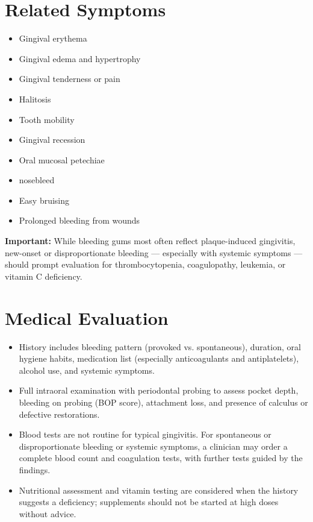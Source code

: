 \section*{Related Symptoms}
\begin{itemize}
 \item Gingival erythema
 \item Gingival edema and hypertrophy
 \item Gingival tenderness or pain
 \item Halitosis
 \item Tooth mobility
 \item Gingival recession
 \item Oral mucosal petechiae
 \item nosebleed
 \item Easy bruising
 \item Prolonged bleeding from wounds
\end{itemize}
\textbf{Important:} While bleeding gums most often reflect plaque-induced gingivitis, new-onset or disproportionate bleeding — especially with systemic symptoms — should prompt evaluation for thrombocytopenia, coagulopathy, leukemia, or vitamin C deficiency.

\section*{Medical Evaluation}
\begin{itemize}
 \item History includes bleeding pattern (provoked vs. spontaneous), duration, oral hygiene habits, medication list (especially anticoagulants and antiplatelets), alcohol use, and systemic symptoms.
 \item Full intraoral examination with periodontal probing to assess pocket depth, bleeding on probing (BOP score), attachment loss, and presence of calculus or defective restorations.
 \item Blood tests are not routine for typical gingivitis. For spontaneous or disproportionate bleeding or systemic symptoms, a clinician may order a complete blood count and coagulation tests, with further tests guided by the findings.
 \item Nutritional assessment and vitamin testing are considered when the history suggests a deficiency; supplements should not be started at high doses without advice.
\end{itemize}

